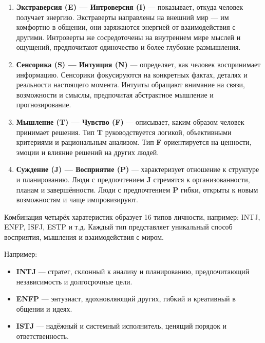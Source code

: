 \begin{enumerate}
	\item \textbf{Экстраверсия (E) --- Интроверсия (I)} --- показывает, откуда человек получает энергию. Экстраверты направлены на внешний мир --- им комфортно в общении, они заряжаются энергией от взаимодействия с другими. Интроверты же сосредоточены на внутреннем мире мыслей и ощущений, предпочитают одиночество и более глубокие размышления.
	
	\item \textbf{Сенсорика (S) --- Интуиция (N)} --- определяет, как человек воспринимает информацию. Сенсорики фокусируются на конкретных фактах, деталях и реальности настоящего момента. Интуиты обращают внимание на связи, возможности и смыслы, предпочитая абстрактное мышление и прогнозирование.
	
	\item \textbf{Мышление (T) --- Чувство (F)} --- описывает, каким образом человек принимает решения. Тип \textbf{T} руководствуется логикой, объективными критериями и рациональным анализом. Тип \textbf{F} ориентируется на ценности, эмоции и влияние решений на других людей.
	
	\item \textbf{Суждение (J) --- Восприятие (P)} --- характеризует отношение к структуре и планированию. Люди с предпочтением \textbf{J} стремятся к организованности, планам и завершённости. Люди с предпочтением \textbf{P} гибки, открыты к новым возможностям и чаще импровизируют.
\end{enumerate}

Комбинация четырёх харатеристик образует 16 типов личности, например: {INTJ, ENFP, ISFJ, ESTP} и т.д.  
Каждый тип представляет уникальный способ восприятия, мышления и взаимодействия с миром.

Например:

\begin{itemize}
	\item \textbf{INTJ} — стратег, склонный к анализу и планированию, предпочитающий независимость и долгосрочные цели.
	\item \textbf{ENFP} — энтузиаст, вдохновляющий других, гибкий и креативный в общении и идеях.
	\item \textbf{ISTJ} — надёжный и системный исполнитель, ценящий порядок и ответственность.
\end{itemize}

